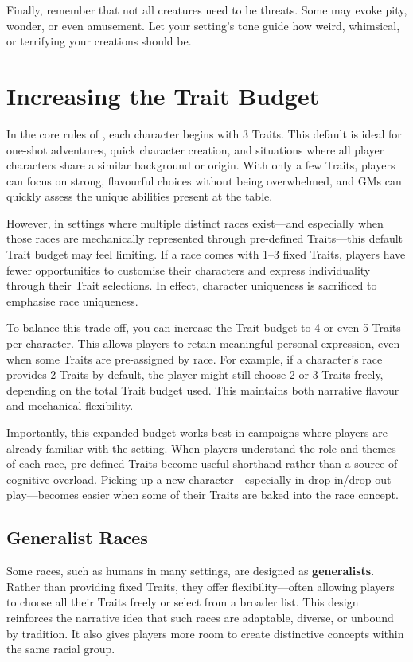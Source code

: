 Finally, remember that not all creatures need to be threats. Some may evoke pity, wonder, or even amusement. Let your setting’s tone guide how weird, whimsical, or terrifying your creations should be.


\section{Increasing the Trait Budget}

In the core rules of \wyrd, each character begins with 3 Traits. This default is ideal for one-shot adventures, quick character creation, and situations where all player characters share a similar background or origin. With only a few Traits, players can focus on strong, flavourful choices without being overwhelmed, and GMs can quickly assess the unique abilities present at the table.

However, in settings where multiple distinct races exist—and especially when those races are mechanically represented through pre-defined Traits—this default Trait budget may feel limiting. If a race comes with 1–3 fixed Traits, players have fewer opportunities to customise their characters and express individuality through their Trait selections. In effect, character uniqueness is sacrificed to emphasise race uniqueness.

To balance this trade-off, you can increase the Trait budget to 4 or even 5 Traits per character. This allows players to retain meaningful personal expression, even when some Traits are pre-assigned by race. For example, if a character’s race provides 2 Traits by default, the player might still choose 2 or 3 Traits freely, depending on the total Trait budget used. This maintains both narrative flavour and mechanical flexibility.

Importantly, this expanded budget works best in campaigns where players are already familiar with the setting. When players understand the role and themes of each race, pre-defined Traits become useful shorthand rather than a source of cognitive overload. Picking up a new character—especially in drop-in/drop-out play—becomes easier when some of their Traits are baked into the race concept.

\subsection*{Generalist Races}

Some races, such as humans in many settings, are designed as \textbf{generalists}. Rather than providing fixed Traits, they offer flexibility—often allowing players to choose all their Traits freely or select from a broader list. This design reinforces the narrative idea that such races are adaptable, diverse, or unbound by tradition. It also gives players more room to create distinctive concepts within the same racial group.

